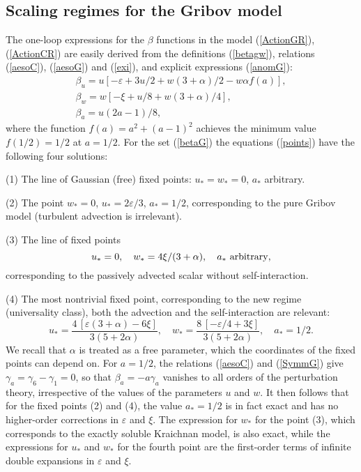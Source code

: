 \documentclass[12pt]{iopart}
\begin{document}
\subsection{Scaling regimes for the Gribov model} \label{sec:GPS}

The one-loop expressions for the $\beta$ functions in the model
(\ref{ActionGR}), (\ref{ActionCR}) are easily derived from the definitions
(\ref{betagw}), relations (\ref{aesoC}), (\ref{aesoG}) and (\ref{exi}),
and explicit expressions (\ref{anomG}):
\begin{eqnarray}
\beta_{u} = u \left[ -\varepsilon+ 3u/2 + w(3+\alpha)/2 -w\alpha f(a) \right],
\nonumber \\
\beta_{w} = w \left[ -\xi +u/8 + w(3+\alpha)/4 \right],
\nonumber \\
\beta_{a} = u(2a-1)/8,
\label{betaG}
\end{eqnarray}
where the function $f(a)=a^{2}+(a-1)^{2}$ achieves the minimum value
$f(1/2) =1/2$ at $a=1/2$. For the set (\ref{betaG}) the equations
(\ref{points}) have the following four solutions:

(1) The line of Gaussian (free) fixed points: $u_{*}=w_{*}=0$, $a_{*}$
arbitrary.

(2) The point $w_{*}=0$, $u_{*}=2\varepsilon/3$, $a_{*}=1/2$, corresponding
to the pure Gribov model (turbulent advection is irrelevant).

(3) The line of fixed points
\begin{equation}
u_{*}=0, \quad w_{*}=4\xi/(3+\alpha), \quad  a_{*} \ {\rm arbitrary},
\label{line3}
\end{equation}
corresponding to the passively advected scalar without self-interaction.

(4) The most nontrivial fixed point, corresponding to the new regime
(universality class), both the advection and the self-interaction are
relevant:
\begin{equation}
u_{*} = \frac{4\,[\varepsilon(3+\alpha)-6\xi]}{3(5+2\alpha)}, \quad
w_{*} = \frac{8\,[-\varepsilon/4+3\xi]}{3(5+2\alpha)}, \quad a_{*}=1/2.
\label{wu4}
\end{equation}
We recall that $\alpha$ is treated as a free parameter, which the
coordinates of the fixed points can depend on.
For $a=1/2$, the relations (\ref{aesoC}) and (\ref{SymmG}) give
$\gamma_{a} = \gamma_{6}-\gamma_{1}=0$, so that $\beta_{a} =-a \gamma_{a}$
vanishes to all orders of the perturbation theory, irrespective of the
values of the parameters $u$ and $w$. It then follows that for the fixed
points (2) and (4), the value $a_{*}=1/2$ is in fact exact and has no
higher-order corrections in $\varepsilon$ and $\xi$.
The expression for $w_{*}$
for the point (3), which corresponds to the exactly soluble Kraichnan model,
is also exact, while the expressions for $u_{*}$ and $w_{*}$ for the
fourth point are the first-order terms of infinite double expansions
in $\varepsilon$ and $\xi$.
\end{document}
